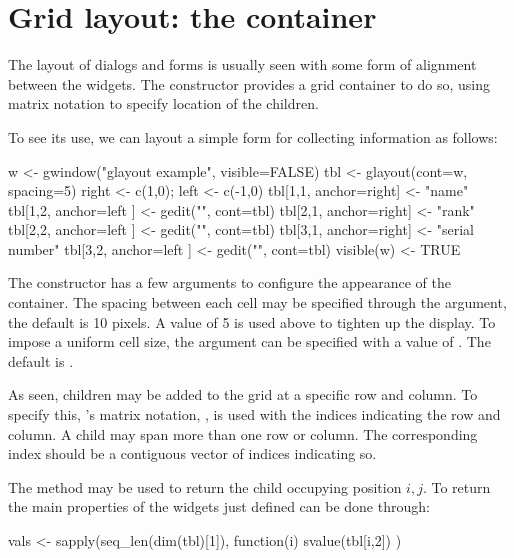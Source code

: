 


\section{Grid layout: the  container}
\label{sec:gWidgets-glayout-container}

The layout of dialogs and forms is usually seen with some form of
alignment between the widgets. The  constructor
provides a grid container to do so, using matrix notation to specify
location of the children.  

To see its use, we can layout a simple form for collecting information
as follows:

\begin{Schunk}
\begin{Sinput}
 w <- gwindow("glayout example", visible=FALSE)
 tbl <- glayout(cont=w, spacing=5)
 right <- c(1,0); left <- c(-1,0)
 tbl[1,1, anchor=right] <- "name"
 tbl[1,2, anchor=left ] <- gedit("", cont=tbl)
 tbl[2,1, anchor=right] <- "rank"
 tbl[2,2, anchor=left ] <- gedit("", cont=tbl)
 tbl[3,1, anchor=right] <- "serial number"
 tbl[3,2, anchor=left ] <- gedit("", cont=tbl)
 visible(w) <- TRUE
\end{Sinput}
\end{Schunk}
%

The constructor has a few arguments to configure the appearance of the
container. The spacing between each cell may be specified through the
 argument, the default is 10 pixels. A
value of 5 is used above to tighten up the display.
To impose a uniform cell size, the 
argument can be specified with a value of . The default is
. 

As seen, children may be added to the grid at a specific row and
column. To specify this, \R's matrix notation, \code{[\ASSIGN}, is
used with the indices indicating the row and column.  A child may span
more than one row or column. The corresponding index should be a
contiguous vector of indices indicating so.  

The \code{[} method may be used to
return the child occupying position $i,j$. To return the main properties of the
widgets just defined can be done through:
\begin{Schunk}
\begin{Sinput}
 vals <- sapply(seq_len(dim(tbl)[1]), function(i) {
   svalue(tbl[i,2])
   })
\end{Sinput}
\end{Schunk}



